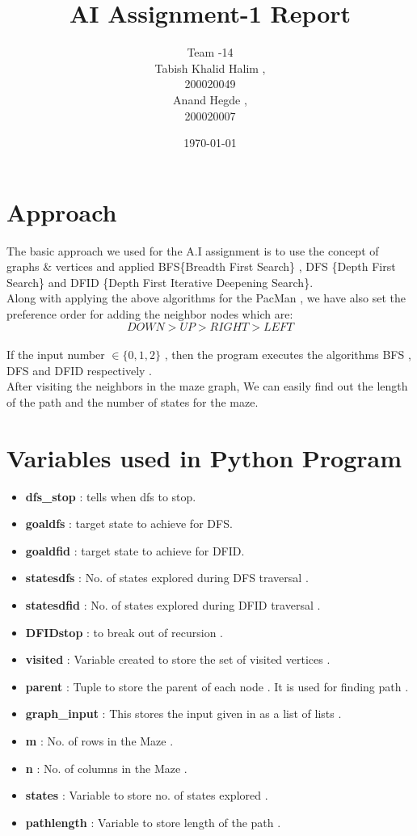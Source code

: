 \documentclass{article}
\title{AI Assignment-1 Report}
\date{\today}
\author{Team -14 \\Tabish Khalid Halim , \\ 200020049 \\ Anand Hegde , \\ 200020007}
\affil{Department of Computer Science, IIT Dharwad}
\begin{document}
\maketitle
{}
\newpage
\tableofcontents

\newpage
{}
\section{Approach}
The basic approach we used for the A.I assignment is to use the concept of graphs \& vertices and 
applied BFS\{Breadth First Search\} , DFS \{Depth First Search\} and DFID \{Depth First Iterative Deepening Search\}.
\vspace{10pt}
\\
Along with applying the above algorithms for the PacMan , we have also set the preference order for adding the neighbor nodes which are:
\\$$DOWN > UP > RIGHT > LEFT$$
\vspace{10pt}
\\If the input number $\in \{0,1,2\}$ , then the program executes the algorithms BFS , DFS and DFID respectively .
\vspace{10pt}
\\After visiting the neighbors in the maze graph, We can easily find out the length of the path and the number of states for the maze.
\newpage
\section{Variables used in Python Program}
\vspace{20pt}
\begin{itemize}
    \item \textbf{dfs\_stop} : tells when dfs to stop.
    \item \textbf{goaldfs} : target state to achieve for DFS.
    \item \textbf{goaldfid} : target state to achieve for DFID.
    \item \textbf{statesdfs} : No. of states explored during DFS traversal .
    \item \textbf{statesdfid} : No. of states explored during DFID traversal .
    \item \textbf{DFIDstop} : to break out of recursion .
    \item \textbf{visited} :  Variable created to store the set of visited vertices .
    \item \textbf{parent} : Tuple to store the parent of each node . It is used for finding path .
    \item \textbf{graph\_input} :  This stores the input given in as a list of lists .
    \item \textbf{m} : No. of rows in the Maze .
    \item \textbf{n} : No. of columns in the Maze .
    \item \textbf{states} : Variable to store no. of states explored .
    \item \textbf{pathlength} : Variable to store length of the path .
\end{itemize}
\newpage
\end{document}
